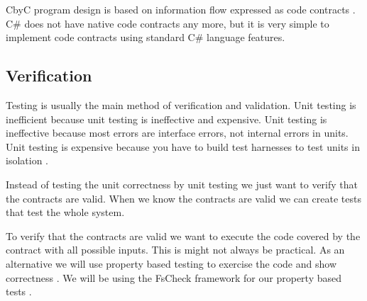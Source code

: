 CbyC program design is based on information flow expressed as code contracts 
\parencite{CbyCMan}. C\# does not have native code contracts any more, but it
is very simple to implement code contracts using standard C\# language features.

\subsection{Verification}
Testing is usually the main method of verification and validation.  Unit testing
is inefficient because unit testing is ineffective and expensive. 
Unit testing is ineffective because most errors are interface errors, not internal
errors in units. Unit testing is expensive because you have to build test 
harnesses to test units in isolation \parencite{CbyCPraxis}.

Instead of testing the unit correctness by unit testing we just want to verify 
that the contracts are valid. When we know the contracts are valid we can 
create tests that test the whole system.

To verify that the contracts are valid we want to execute the code covered by the
contract with all possible inputs. This is might not always be practical. 
As an alternative we will use property based testing to exercise the code and show 
correctness \parencite{QuickCheck} \parencite{Hamlet94randomtesting}. We will be
using the FsCheck framework for our property based tests \parencite{FsCheck_home}.
